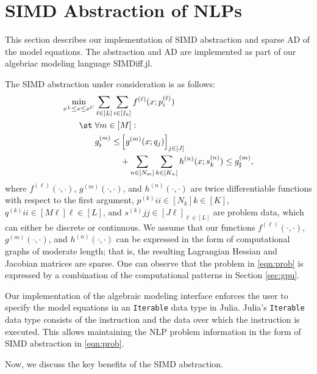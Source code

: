 \section{SIMD Abstraction of NLPs}\label{sec:simd}

This section describes our implementation of SIMD abstraction and
sparse AD of the model equations. The abstraction and AD are
implemented as part of our algebriac modeling language SIMDiff.jl.

The SIMD abstraction under consideration is as follows:
\begin{subequations}\label{eqn:prob}
  \begin{align}
    \min_{x^L\leq x \leq x^U}& \sum_{\ell\in[L]}\sum_{i\in [I_k]} f^{(\ell)}(x; p^{(\ell)}_i)\\
    \st\; &\forall m\in[M]:\\
                             &\begin{aligned}[t]
                               g^{(m)}_\flat\leq &\left[g^{(m)}(x; q_j)\right]_{j\in [J]} \\
                               &+\sum_{n\in [N_m]}\sum_{k\in [K_n]}h^{(n)}(x; s^{(n)}_{k}) \leq g^{(m)}_\sharp,
                             \end{aligned}
  \end{align}
\end{subequations}
where $f^{(\ell)}(\cdot,\cdot)$, $g^{(m)}(\cdot,\cdot)$, and
$h^{(n)}(\cdot,\cdot)$ are twice differentiable functions with respect
to the first argument, ${{p^{(k)}i}{i\in [N_k]}}{k\in[K]}$,
${{q^{(k)}{i}}{i\in [M\ell]}}{\ell\in[L]}$, and
${{s^{(k)}{j}}{j\in[J\ell]}}_{\ell\in[L]}$ are problem data, which can
either be discrete or continuous. We assume that our functions
$f^{(\ell)}(\cdot,\cdot)$, $g^{(m)}(\cdot,\cdot)$, and
$h^{(n)}(\cdot,\cdot)$ can be expressed in the form of computational
graphs of moderate length; that is, the resulting Lagrangian Hessian
and Jacobian matrices are sparse. One can observe that the problem in
\eqref{eqn:prob} is expressed by a combination of the computational
patterns in Section \ref{sec:gpu}.

Our implementation of the algebraic modeling interface enforces the
user to specify the model equations in an {\tt Iterable} data type in
Julia. Julia's {\tt Iterable} data type consists of the instruction
and the data over which the instruction is executed. This allows
maintaining the NLP problem information in the form of SIMD
abstraction in \eqref{eqn:prob}.

Now, we discuss the key benefits of the SIMD abstraction.

